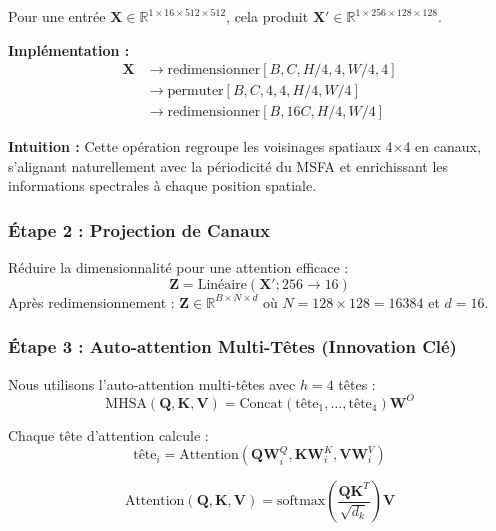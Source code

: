 \documentclass[conference]{IEEEtran}
\begin{document}
Pour une entrée $\mathbf{X} \in \mathbb{R}^{1 \times 16 \times 512 \times 512}$, cela produit $\mathbf{X}' \in \mathbb{R}^{1 \times 256 \times 128 \times 128}$.

\textbf{Implémentation :}
\begin{equation}
\begin{aligned}
\mathbf{X} &\rightarrow \text{redimensionner}[B, C, H/4, 4, W/4, 4] \\
&\rightarrow \text{permuter}[B, C, 4, 4, H/4, W/4] \\
&\rightarrow \text{redimensionner}[B, 16C, H/4, W/4]
\end{aligned}
\end{equation}

\textbf{Intuition :} Cette opération regroupe les voisinages spatiaux 4×4 en canaux, s'alignant naturellement avec la périodicité du MSFA et enrichissant les informations spectrales à chaque position spatiale.

\subsubsection{Étape 2 : Projection de Canaux}

Réduire la dimensionnalité pour une attention efficace :
\begin{equation}
\mathbf{Z} = \text{Linéaire}(\mathbf{X}'; 256 \rightarrow 16)
\end{equation}
Après redimensionnement : $\mathbf{Z} \in \mathbb{R}^{B \times N \times d}$ où $N = 128 \times 128 = 16384$ et $d = 16$.

\subsubsection{Étape 3 : Auto-attention Multi-Têtes (Innovation Clé)}

Nous utilisons l'auto-attention multi-têtes avec $h=4$ têtes :
\begin{equation}
\text{MHSA}(\mathbf{Q}, \mathbf{K}, \mathbf{V}) = \text{Concat}(\text{tête}_1, \ldots, \text{tête}_4)\mathbf{W}^O
\end{equation}

Chaque tête d'attention calcule :
\begin{equation}
\text{tête}_i = \text{Attention}(\mathbf{Q}\mathbf{W}_i^Q, \mathbf{K}\mathbf{W}_i^K, \mathbf{V}\mathbf{W}_i^V)
\end{equation}

\begin{equation}
\text{Attention}(\mathbf{Q}, \mathbf{K}, \mathbf{V}) = \text{softmax}\left(\frac{\mathbf{Q}\mathbf{K}^T}{\sqrt{d_k}}\right)\mathbf{V}
\end{equation}
\end{document}
